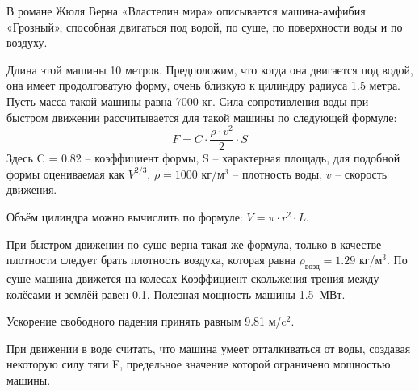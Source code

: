 
В романе Жюля Верна «Властелин мира» описывается машина-амфибия «Грозный», способная двигаться под водой, 
по суше, по поверхности воды и по воздуху. 

Длина этой машины 10 метров. Предположим, что когда она двигается под водой, она имеет продолговатую 
форму, очень близкую к цилиндру радиуса 1.5 метра. Пусть масса такой машины равна 7000 кг. 
Сила сопротивления воды при быстром движении рассчитывается для такой машины по следующей формуле:
$$F=C \cdot \frac{\rho  \cdot v^2}{2} \cdot S$$
Здесь C = 0.82 – коэффициент формы, S – характерная площадь, для подобной формы оцениваемая как $V^{2/3}$, 
$\rho  = 1000$ кг/м$^3$ – плотность воды, $v$ – скорость движения.

Объём цилиндра можно вычислить по формуле:  $V=\pi \cdot r^2 \cdot L$.

При быстром движении по суше верна такая же формула, только в качестве плотности следует брать 
плотность воздуха, которая равна  $\rho_\text{возд} = 1.29$ кг/м$^3$. По суше машина движется на колесах Коэффициент скольжения трения между колёсами и землёй равен 0.1, 
Полезная мощность машины 1.5~МВт.

Ускорение свободного падения принять равным 9.81 м/c$^2$.

При движении в воде считать, что машина умеет отталкиваться от воды, создавая некоторую силу тяги F, предельное 
значение которой ограничено мощностью машины.

